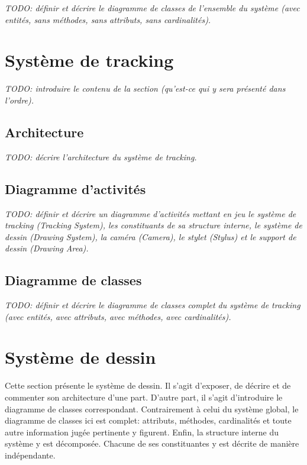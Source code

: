 \documentclass[11pt,a4paper,oldfontcommands]{memoir}
\begin{document}
\textit{TODO: définir et décrire le diagramme de classes de l'ensemble du système (avec entités, sans méthodes, sans attributs, sans cardinalités).}

\newpage

\section{Système de tracking}

\textit{TODO: introduire le contenu de la section (qu'est-ce qui y sera présenté dans l'ordre).}

\subsection{Architecture}

\textit{TODO: décrire l'architecture du système de tracking.}

\subsection{Diagramme d'activités}

\textit{TODO: définir et décrire un diagramme d'activités mettant en jeu le système de tracking (Tracking System), les constituants de sa structure interne, le système de dessin (Drawing System), la caméra (Camera), le stylet (Stylus) et le support de dessin (Drawing Area).}

\subsection{Diagramme de classes}

\textit{TODO: définir et décrire le diagramme de classes complet du système de tracking (avec entités, avec attributs, avec méthodes, avec cardinalités).}

\newpage

\section{Système de dessin}

Cette section présente le système de dessin. Il s'agit d'exposer, de décrire et de commenter son architecture d'une part. D'autre part, il s'agit d'introduire le diagramme de classes correspondant. Contrairement à celui du système global, le diagramme de classes ici est complet: attributs, méthodes, cardinalités et toute autre information jugée pertinente y figurent. Enfin, la structure interne du système y est décomposée. Chacune de ses constituantes y est décrite de manière indépendante.
\end{document}

